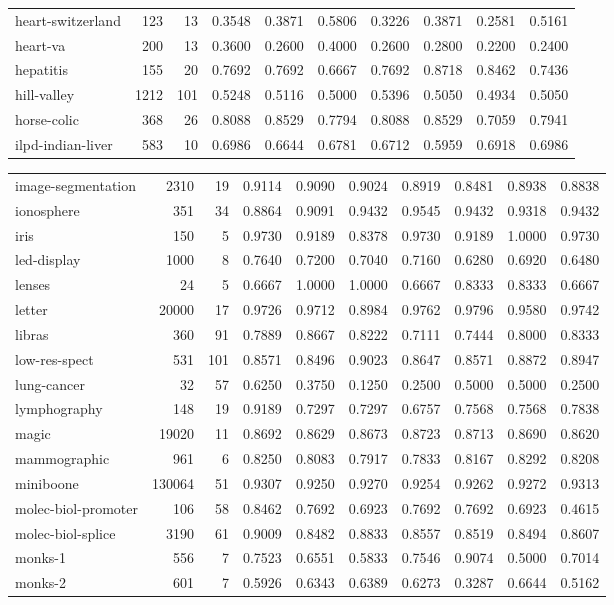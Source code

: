\documentclass{article}
\begin{document}
\begin{table}
\begin{tabular}{lrrlllllll}
heart-switzerland & 123 & 13 & 0.3548 & 0.3871 & 0.5806 & 0.3226 & 0.3871 & 0.2581 & 0.5161\tabularnewline
heart-va & 200 & 13 & 0.3600 & 0.2600 & 0.4000 & 0.2600 & 0.2800 & 0.2200 & 0.2400\tabularnewline
hepatitis & 155 & 20 & 0.7692 & 0.7692 & 0.6667 & 0.7692 & 0.8718 & 0.8462 & 0.7436\tabularnewline
hill-valley & 1212 & 101 & 0.5248 & 0.5116 & 0.5000 & 0.5396 & 0.5050 & 0.4934 & 0.5050\tabularnewline
horse-colic & 368 & 26 & 0.8088 & 0.8529 & 0.7794 & 0.8088 & 0.8529 & 0.7059 & 0.7941\tabularnewline
ilpd-indian-liver & 583 & 10 & 0.6986 & 0.6644 & 0.6781 & 0.6712 & 0.5959 & 0.6918 & 0.6986\tabularnewline
\end{tabular}
\end{table}

\begin{table}
\footnotesize
\begin{tabular}{lrrlllllll}
image-segmentation & 2310 & 19 & 0.9114 & 0.9090 & 0.9024 & 0.8919 & 0.8481 & 0.8938 & 0.8838\tabularnewline
ionosphere & 351 & 34 & 0.8864 & 0.9091 & 0.9432 & 0.9545 & 0.9432 & 0.9318 & 0.9432\tabularnewline
iris & 150 & 5 & 0.9730 & 0.9189 & 0.8378 & 0.9730 & 0.9189 & 1.0000 & 0.9730\tabularnewline
led-display & 1000 & 8 & 0.7640 & 0.7200 & 0.7040 & 0.7160 & 0.6280 & 0.6920 & 0.6480\tabularnewline
lenses & 24 & 5 & 0.6667 & 1.0000 & 1.0000 & 0.6667 & 0.8333 & 0.8333 & 0.6667\tabularnewline
letter & 20000 & 17 & 0.9726 & 0.9712 & 0.8984 & 0.9762 & 0.9796 & 0.9580 & 0.9742\tabularnewline
libras & 360 & 91 & 0.7889 & 0.8667 & 0.8222 & 0.7111 & 0.7444 & 0.8000 & 0.8333\tabularnewline
low-res-spect & 531 & 101 & 0.8571 & 0.8496 & 0.9023 & 0.8647 & 0.8571 & 0.8872 & 0.8947\tabularnewline
lung-cancer & 32 & 57 & 0.6250 & 0.3750 & 0.1250 & 0.2500 & 0.5000 & 0.5000 & 0.2500\tabularnewline
lymphography & 148 & 19 & 0.9189 & 0.7297 & 0.7297 & 0.6757 & 0.7568 & 0.7568 & 0.7838\tabularnewline
magic & 19020 & 11 & 0.8692 & 0.8629 & 0.8673 & 0.8723 & 0.8713 & 0.8690 & 0.8620\tabularnewline
mammographic & 961 & 6 & 0.8250 & 0.8083 & 0.7917 & 0.7833 & 0.8167 & 0.8292 & 0.8208\tabularnewline
miniboone & 130064 & 51 & 0.9307 & 0.9250 & 0.9270 & 0.9254 & 0.9262 & 0.9272 & 0.9313\tabularnewline
molec-biol-promoter & 106 & 58 & 0.8462 & 0.7692 & 0.6923 & 0.7692 & 0.7692 & 0.6923 & 0.4615\tabularnewline
molec-biol-splice & 3190 & 61 & 0.9009 & 0.8482 & 0.8833 & 0.8557 & 0.8519 & 0.8494 & 0.8607\tabularnewline
monks-1 & 556 & 7 & 0.7523 & 0.6551 & 0.5833 & 0.7546 & 0.9074 & 0.5000 & 0.7014\tabularnewline
monks-2 & 601 & 7 & 0.5926 & 0.6343 & 0.6389 & 0.6273 & 0.3287 & 0.6644 & 0.5162\tabularnewline

\end{tabular}
\end{table}
\end{document}
